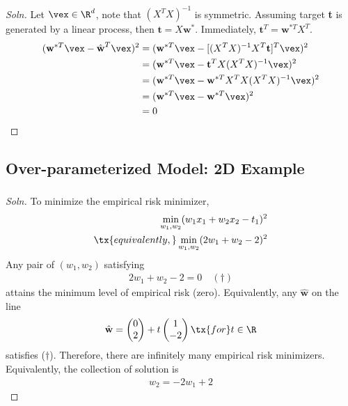 \documentclass{article}
\begin{document}
	\subsubsection{}
	\begin{proof}[Soln]
		Let $\vex \in \R^d$, note that $(X^T X)^{-1}$ is symmetric. Assuming target \textbf{t} is generated by a linear process, then $\textbf{t} = X \textbf{w}^*$. Immediately, $\textbf{t}^T = \textbf{w}^{*T} X^T$.
		\begin{align}
			(\textbf{w}^{*T} \vex  -  \hat{\textbf{w}}^{T} \vex)^2 
			&= (\textbf{w}^{*T} \vex - [(X^T X)^{-1} X^T \textbf{t}]^T \vex)^2 \\
			&= (\textbf{w}^{*T} \vex - \textbf{t}^T X (X^T X)^{-1} \vex)^2 \\
			&= (\textbf{w}^{*T} \vex - \textbf{w}^{*T} X^T X (X^T X)^{-1} \vex)^2 \\
			&= (\textbf{w}^{*T} \vex - \textbf{w}^{*T} \vex)^2 \\
			&= 0
		\end{align}
	\end{proof}
	
	\subsection{Over-parameterized Model: 2D Example}
	\subsubsection{}
	\begin{proof}[Soln]
		To minimize the empirical risk minimizer, 
		\begin{align}
			\min_{w_1, w_2} (w_1 x_1 + w_2 x_2 - t_1)^2 \\
			\tx{equivalently, } \min_{w_1, w_2} (2 w_1 + w_2 - 2)^2
		\end{align}
		Any pair of $(w_1, w_2)$ satisfying
		\begin{align}
			2 w_1 + w_2 - 2 = 0\quad (\dagger)
		\end{align}
		attains the minimum level of empirical risk (zero). Equivalently, any $\hat{\textbf{w}}$ on the line
		\begin{align}
			\hat{\textbf{w}} = \begin{pmatrix}
				0 \\ 2
			\end{pmatrix} + t \begin{pmatrix}
				1 \\ -2
			\end{pmatrix} \tx{ for } t \in \R
		\end{align}
		satisfies ($\dagger$). Therefore, there are infinitely many empirical risk minimizers. \\
		Equivalently, the collection of solution is
		\begin{align}
			w_2 = -2 w_1 + 2
		\end{align}
	\end{proof}
\end{document}
